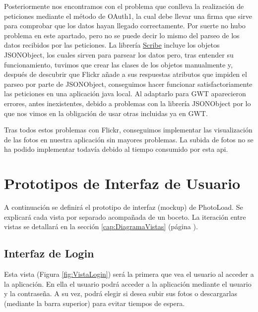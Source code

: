 \documentclass{scrartcl}
\begin{document}
Posteriormente nos encontramos con el problema que conlleva la realización de peticiones mediante el método de OAuth1, la cual debe llevar una firma que sirve para comprobar que los datos hayan llegado correctamente. Por suerte no hubo problema en este apartado, pero no se puede decir lo mismo del parseo de los datos recibidos por las peticiones. La librería \href{https://github.com/fernandezpablo85/scribe-java}{Scribe} incluye los objetos JSONObject, los cuales sirven para parsear los datos pero, tras entender su funcionamiento, tuvimos que crear las clases de los objetos manualmente y, después de descubrir que Flickr añade a sus respuestas atributos que impiden el parseo por parte de JSONObject, conseguimos hacer funcionar satisfactoriamente las peticiones en una aplicación java local. Al adaptarlo para GWT aparecieron errores, antes inexistentes, debido a problemas con la librería JSONObject por lo que nos vimos en la obligación de usar otras incluidas ya en GWT.

Tras todos estos problemas con Flickr, conseguimos implementar las visualización de las fotos en nuestra aplicación sin mayores problemas. La subida de fotos no se ha podido implementar todavía debido al tiempo consumido por esta api.



\section{Prototipos de Interfaz de Usuario}
A continuación se definirá el prototipo de interfaz (mockup) de PhotoLoad. Se explicará cada vista por separado acompañada de un boceto. La iteración entre vistas se detallará en la sección \ref{cap:DiagramaVistas} (página \pageref{cap:DiagramaVistas}).
\subsection{Interfaz de Login}
Esta vista (Figura \ref{fig:VistaLogin}) será la primera que vea el usuario al acceder a la aplicación. En ella el usuario podrá acceder a la aplicación mediante el usuario y la contraseña. A su vez, podrá elegir si desea subir sus fotos o descargarlas (mediante la barra superior) para evitar tiempos de espera.
\end{document}
